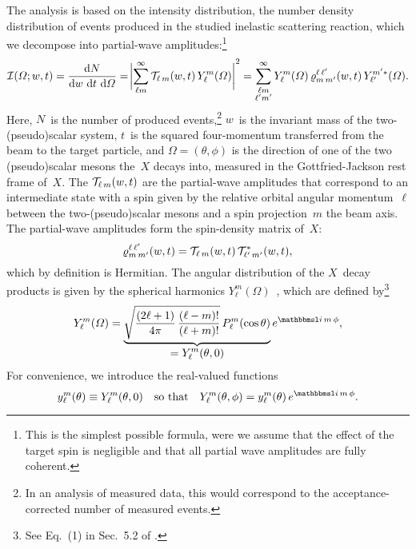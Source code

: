 The analysis is based on the intensity distribution, \ie the number
density distribution of events produced in the studied inelastic
scattering reaction, which we decompose into partial-wave
amplitudes:\footnote{This is the simplest possible formula, were we
assume that the effect of the target spin is negligible and that all
partial wave amplitudes are fully coherent.}
\begin{equation}
  \label{eq:diffraction_intensity}
  \intensity(\Omega; w, t)
  = \frac{\dif{N}}{\dif{w}\, \dif{t}\, \dif{\Omega}}
  = \Abs[3]{\sum_{\ell m}^\infty \prodAmp_{\ell\, m}(w, t)\, Y_\ell^m(\Omega)}^2
  = \sum_{\substack{\ell m \\ \ell' m'}}^\infty Y_\ell^m(\Omega)\, \varrho^{\ell\, \ell'}_{m\, m'}(w, t)\, Y_{\ell'}^{m' *}(\Omega).
\end{equation}
Here, $N$~is the number of produced events,\footnote{In an analysis of
measured data, this would correspond to the acceptance-corrected
number of measured events.} $w$~is the invariant mass of the
two-(pseudo)scalar system, $t$~is the squared four-momentum
transferred from the beam to the target particle, and $\Omega =
(\theta, \phi)$ is the direction of one of the two (pseudo)scalar
mesons the~$X$ decays into, measured in the Gottfried-Jackson rest
frame of~$X$.  The $\mathcal{T}_{\ell\, m}(w, t)$ are the partial-wave
amplitudes that correspond to an intermediate state with a spin given
by the relative orbital angular momentum~$\ell$ between the
two-(pseudo)scalar mesons and a spin projection~$m$ \wrt the beam
axis.  The partial-wave amplitudes form the spin-density matrix
of~$X$:
\begin{equation}
  \label{eq:diffraction_spin_dens_def}
  \varrho^{\ell\, \ell'}_{m\, m'}(w, t)
  = \mathcal{T}_{\ell\, m}(w, t)\, \mathcal{T}_{\ell'\, m'}^*(w, t),
\end{equation}
which by definition is Hermitian.  The angular distribution of the
$X$~decay products is given by the spherical harmonics
$Y_\ell^m(\Omega)$~\cite{wikipedia:sphericalHarm}, which are defined
by\footnote{See Eq.~(1) in Sec.~5.2 of
.}
\begin{equation}
  \label{eq:spherical_harm_def}
  Y_\ell^m(\Omega)
  = \dUnderbrace{\sqrt{\frac{(2 \ell + 1)}{4 \pi}\, \frac{(\ell -m)!}{(\ell + m)!}}\, P_\ell^m(\cos\theta)}{= Y_\ell^m(\theta, 0)}\, e^{\imag\, m\, \phi},
\end{equation}
For convenience, we introduce the real-valued functions
\begin{equation}
  \label{eq:small_y_def}
  y_\ell^m(\theta)
  \equiv Y_\ell^m(\theta, 0)
  \quad\text{so that}\quad
  Y_\ell^m(\theta, \phi)
  = y_\ell^m(\theta)\, e^{\imag\, m\, \phi}.
\end{equation}
